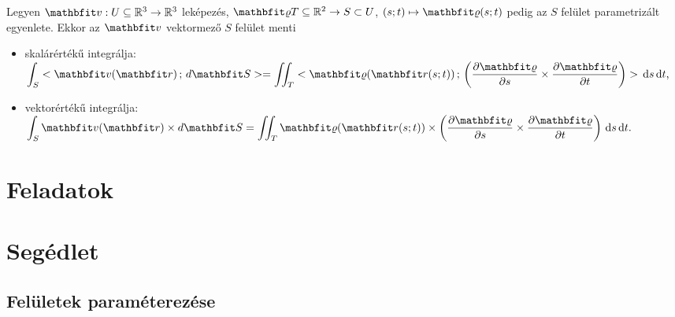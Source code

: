 \documentclass[lang=magyar]{math-handout}
\begin{document}
\vfill

\begin{definition}
  Legyen $\rvec v:  U \subseteq \mathbb R^3 \rightarrow \mathbb R^3$ leképezés,
  $\rvec \varrho T \subseteq \mathbb R^2 \rightarrow S \subset U$, $(s;t)
    \mapsto \rvec \varrho(s;t)$ pedig az $S$ felület parametrizált egyenlete.
  Ekkor az $\rvec v$ vektormező $S$ felület menti
  \begin{itemize}
    \item skalárértékű integrálja:
          \(
            \displaystyle
            \int_S \scalar{\rvec v (\rvec r)}{d \rvec S} =
            \iint_T \scalar
            {\rvec \varrho (\rvec r(s; t))}
            {\left(\pdv{\rvec \varrho}{s} \times \pdv{\rvec \varrho}{t}\right)}
            \, \diff s \, \diff t
            \text,
          \)
    \item vektorértékű integrálja:
          \(
            \displaystyle
            \int_S \rvec v (\rvec r) \times d \rvec S =
            \iint_T {\rvec \varrho (\rvec r(s; t))} \times
            \left(\pdv{\rvec \varrho}{s} \times \pdv{\rvec \varrho}{t}\right)
            \, \diff s \, \diff t
            \text.
          \)

  \end{itemize}
\end{definition}

\clearpage
\section{Feladatok}

\clearpage
\section{Segédlet}

\subsection{Felületek paraméterezése}
\end{document}
